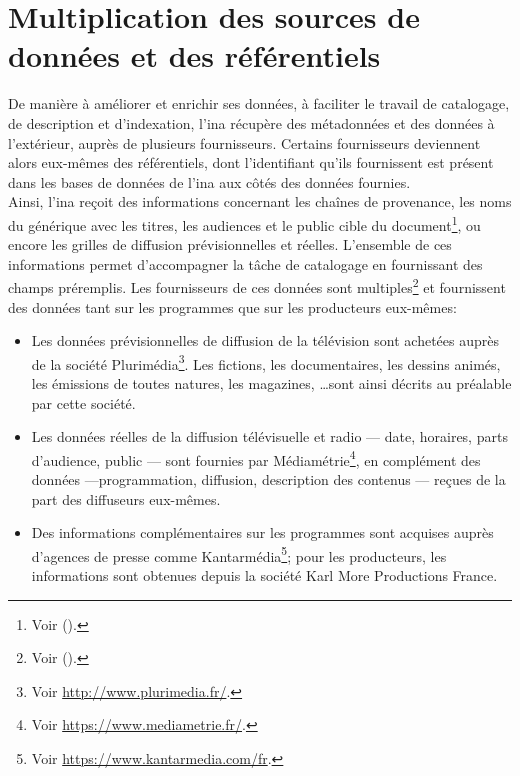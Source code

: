 \section{\label{I-B-3}Multiplication des sources de données et des référentiels}

De manière à améliorer et enrichir ses données, à faciliter le travail de catalogage, de description et d'indexation, l'\ac{ina} récupère des métadonnées et des données à l'extérieur, auprès de plusieurs fournisseurs. Certains fournisseurs deviennent alors eux-mêmes des référentiels, dont l'identifiant qu'ils fournissent est présent dans les bases de données de l'\ac{ina} aux côtés des données fournies.\\

Ainsi, l'\ac{ina} reçoit des informations concernant les chaînes de provenance, les noms du générique avec les titres, les audiences et le public cible du document\footnote{Voir  ().}, ou encore les grilles de diffusion prévisionnelles et réelles. L'ensemble de ces informations permet d'accompagner la tâche de catalogage en fournissant des champs préremplis. Les fournisseurs de ces données sont multiples\footnote{Voir  ().} et fournissent des données tant sur les programmes que sur les producteurs eux-mêmes: 
\begin{itemize}
	\item Les données prévisionnelles de diffusion de la télévision sont achetées auprès de la société Plurimédia\footnote{Voir \url{http://www.plurimedia.fr/}.}. Les fictions, les documentaires, les dessins animés, les émissions de toutes natures, les magazines, \dots sont ainsi décrits au préalable par cette société.
	\item Les données réelles de la diffusion télévisuelle et radio --- date, horaires, parts d'audience, public --- sont fournies par Médiamétrie\footnote{Voir \url{https://www.mediametrie.fr/}.}, en complément des données ---programmation, diffusion, description des contenus --- reçues de la part des diffuseurs eux-mêmes.
	\item Des informations complémentaires sur les programmes sont acquises auprès d'agences de presse comme Kantarmédia\footnote{Voir \url{https://www.kantarmedia.com/fr}.}; pour les producteurs, les informations sont obtenues depuis la société Karl More Productions France.
\end{itemize}